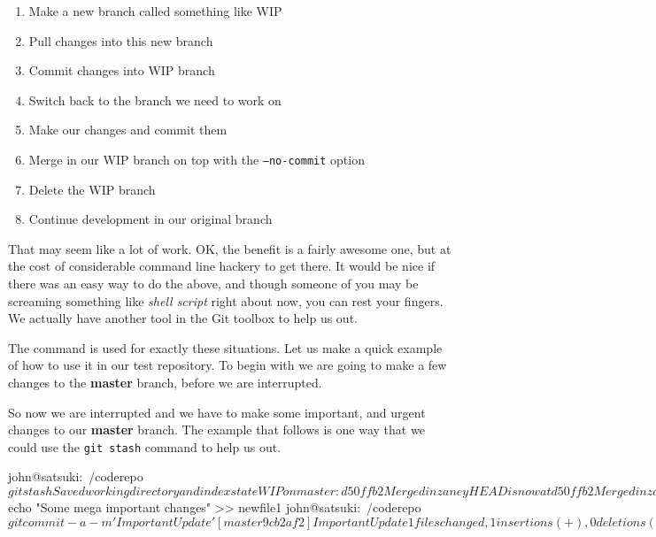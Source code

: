 \begin{enumerate}
\item Make a new branch called something like WIP
\item Pull changes into this new branch
\item Commit changes into WIP branch
\item Switch back to the branch we need to work on
\item Make our changes and commit them
\item Merge in our WIP branch on top with the \texttt{--no-commit} option
\item Delete the WIP branch
\item Continue development in our original branch
\end{enumerate}

That may seem like a lot of work.
OK, the benefit is a fairly awesome one, but at the cost of considerable command line hackery to get there.
It would be nice if there was an easy way to do the above, and though someone of you may be screaming something like \emph{shell script} right about now, you can rest your fingers.
We actually have another tool in the Git toolbox to help us out.

The  command is used for exactly these situations.
Let us make a quick example of how to use it in our test repository.
To begin with we are going to make a few changes to the \textbf{master} branch, before we are interrupted.


So now we are interrupted and we have to make some important, and urgent changes to our \textbf{master} branch.
The example that follows is one way that we could use the \texttt{git stash} command to help us out.

\begin{code}
john@satsuki:~/coderepo$ git stash
Saved working directory and index state WIP on master: d50ffb2 Merged in zaney
HEAD is now at d50ffb2 Merged in zaney
john@satsuki:~/coderepo$ echo "Some mega important changes" >> newfile1
john@satsuki:~/coderepo$ git commit -a -m 'Important Update'
[master 9cb2af2] Important Update
 1 files changed, 1 insertions(+), 0 deletions(-)
john@satsuki:~/coderepo$
\end{code}


